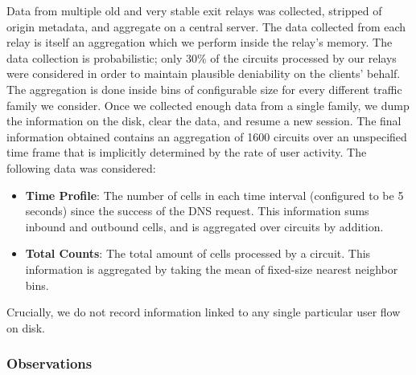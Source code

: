 Data from multiple old and very stable exit relays was collected, stripped of
origin metadata, and aggregate on a central server. The data collected from each
relay is itself an aggregation which we perform inside the relay's memory. The
data collection is probabilistic; only 30\% of the circuits processed by our
relays were considered in order to maintain plausible deniability on the
clients' behalf. The aggregation is done inside bins of configurable size for
every different traffic family we consider. Once we collected enough data from a
single family, we dump the information on the disk, clear the data, and resume a
new session. The final information obtained contains an aggregation of 1600
circuits over an unspecified time frame that is implicitly determined by the
rate of user activity. The following data was considered:

\begin{itemize}
\item \textbf{Time Profile}: The number of cells in each time interval
  (configured to be 5 seconds) since the success of the DNS request. This
  information sums inbound and outbound cells, and is aggregated over circuits
  by addition.
\item \textbf{Total Counts}: The total amount of cells processed by a
  circuit. This information is aggregated by taking the mean of fixed-size
  nearest neighbor bins.
\end{itemize}

Crucially, we do not record information linked to any single particular user
flow on disk.

\subsubsection{Observations}

